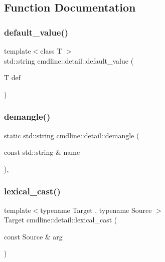 \subsection{Function Documentation}
\mbox{\label{namespacecmdline_1_1detail_a0d8a8c2598d920091d2c1055516f8005}} 
\subsubsection{\texorpdfstring{default\_value()}{default\_value()}}
{\footnotesize\ttfamily template$<$class T $>$ \\
std\+::string cmdline\+::detail\+::default\+\_\+value (\begin{DoxyParamCaption}\item[{T}]{def }\end{DoxyParamCaption})}

\mbox{\label{namespacecmdline_1_1detail_a531047ed8f52b62caae26ab166520987}} 
\subsubsection{\texorpdfstring{demangle()}{demangle()}}
{\footnotesize\ttfamily static std\+::string cmdline\+::detail\+::demangle (\begin{DoxyParamCaption}\item[{const std\+::string \&}]{name }\end{DoxyParamCaption})\hspace{0.3cm}{\ttfamily [inline]}, {\ttfamily [static]}}

\mbox{\label{namespacecmdline_1_1detail_a5cd4d0bedba599ae78fc3b477d5b89fa}} 
\subsubsection{\texorpdfstring{lexical\_cast()}{lexical\_cast()}}
{\footnotesize\ttfamily template$<$typename Target , typename Source $>$ \\
Target cmdline\+::detail\+::lexical\+\_\+cast (\begin{DoxyParamCaption}\item[{const Source \&}]{arg }\end{DoxyParamCaption})}

